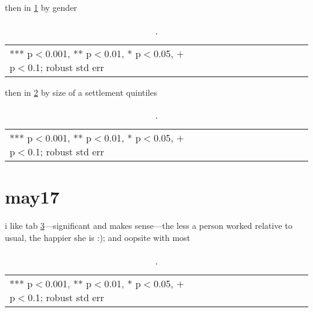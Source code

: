 \documentclass[10pt, letterpaper]{article}
\begin{document}
\begin{spacing}{1.4}
then in \ref{regMale} by gender


\begin{spacing}{.9}
  \begin{table}[H]\centering \caption{.} \label{regMale} \begin{scriptsize} \begin{tabular}{p{1.8in}p{.5in}p{.5in}p{.5in}p{.5in}p{.5in}p{.5in}p{.5in}p{.5in}p{.5in}p{.5
            in}p{.5in}p{.5 in}}\hline
        
\hline  *** p$<$0.001, ** p$<$0.01, * p$<$0.05, $+$ p$<$0.1; robust std err
         \end{tabular}\end{scriptsize}\end{table}
\end{spacing}


then in \ref{regSiz} by size of a settlement quintiles


\begin{spacing}{.9}
  \begin{table}[H]\centering \caption{.} \label{regSiz} \begin{scriptsize} \begin{tabular}{p{1.8in}p{.5in}p{.5in}p{.5in}p{.5in}p{.5in}p{.5in}p{.5in}p{.5in}p{.5in}p{.5
            in}p{.5in}p{.5 in}}\hline
        
\hline  *** p$<$0.001, ** p$<$0.01, * p$<$0.05, $+$ p$<$0.1; robust std err
         \end{tabular}\end{scriptsize}\end{table}
\end{spacing}



\section{may17}


i like tab \ref{lm1}---significant and makes sense---the less a person worked
relative to usual, the happier she is :); and oopsite with most

\begin{spacing}{.9}
  \begin{table}[H]\centering \caption{.} \label{lm1} \begin{scriptsize} \begin{tabular}{p{1.8in}p{.5in}p{.5in}p{.5in}p{.5in}p{.5in}p{.5in}p{.5in}p{.5in}p{.5in}p{.5
            in}p{.5in}p{.5 in}}\hline
        
\hline  *** p$<$0.001, ** p$<$0.01, * p$<$0.05, $+$ p$<$0.1; robust std err
         \end{tabular}\end{scriptsize}\end{table}
\end{spacing}



\end{spacing}
\end{document}
